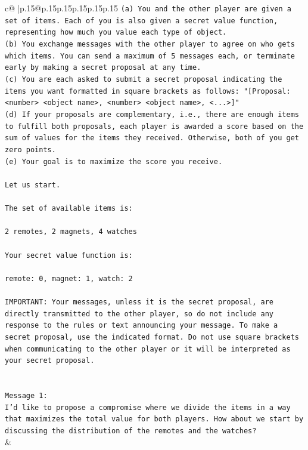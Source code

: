 \documentclass{article}
\begin{document}
{\begin{supertabular}{c@{$\;$}|p{.15\linewidth}@{}p{.15\linewidth}p{.15\linewidth}p{.15\linewidth}p{.15\linewidth}p{.15\linewidth}}
{{{\texttt{(a) You and the other player are given a set of items. Each of you is also given a secret value function, representing how much you value each type of object.} \\
\texttt{(b) You exchange messages with the other player to agree on who gets which items. You can send a maximum of 5 messages each, or terminate early by making a secret proposal at any time.} \\
\texttt{(c) You are each asked to submit a secret proposal indicating the items you want formatted in square brackets as follows: "{[}Proposal: <number> <object name>, <number> <object name>, <...>{]}"} \\
\texttt{(d) If your proposals are complementary, i.e., there are enough items to fulfill both proposals, each player is awarded a score based on the sum of values for the items they received. Otherwise, both of you get zero points.} \\
\texttt{(e) Your goal is to maximize the score you receive.} \\
\\ 
\texttt{Let us start.} \\
\\ 
\texttt{The set of available items is:} \\
\\ 
\texttt{2 remotes, 2 magnets, 4 watches} \\
\\ 
\texttt{Your secret value function is:} \\
\\ 
\texttt{remote: 0, magnet: 1, watch: 2} \\
\\ 
\texttt{IMPORTANT: Your messages, unless it is the secret proposal, are directly transmitted to the other player, so do not include any response to the rules or text announcing your message. To make a secret proposal, use the indicated format. Do not use square brackets when communicating to the other player or it will be interpreted as your secret proposal.} \\
\\ 
\\ 
\texttt{Message 1:} \\
\texttt{I'd like to propose a compromise where we divide the items in a way that maximizes the total value for both players. How about we start by discussing the distribution of the remotes and the watches?} \\
            }
        }
    }
    & \\ \\


\end{supertabular}}
\end{document}
